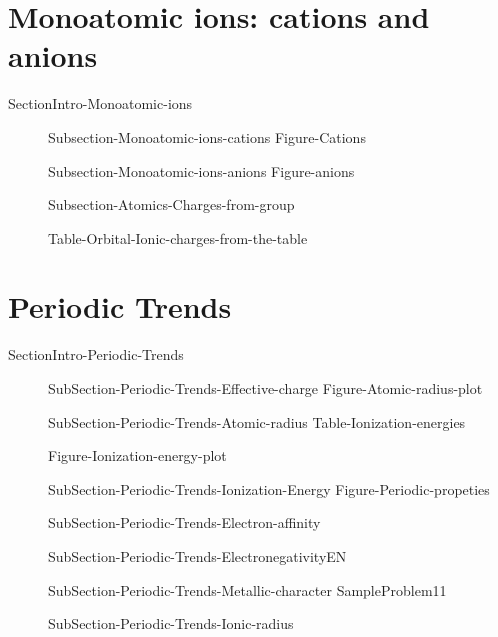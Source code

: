 \documentclass[main.tex]{subfiles}
\newcommand\chapterlabel{Ch-radiation}\setcounter{figurenewcounter}{0}\setcounter{tablenewcounter}{0}\setcounter{formulanewcounter}{0}\chapterpicture{../{\chapterlabel}/figure1}\chapterpicturelabel{PngImg}
\begin{document}
\section{Monoatomic ions: cations and anions}{SectionIntro-Monoatomic-ions}
\sloppy\begin{description}
\item[]{Subsection-Monoatomic-ions-cations}
{Figure-Cations}
\item[]{Subsection-Monoatomic-ions-anions}
{Figure-anions}
\item[]{Subsection-Atomics-Charges-from-group}

{Table-Orbital-Ionic-charges-from-the-table}

\end{description}
\newpage



\section{Periodic Trends}{SectionIntro-Periodic-Trends}
\vspace{0cm}{Figure-Atomic-radius}

\sloppy\begin{description}
\item[] {SubSection-Periodic-Trends-Effective-charge}
{Figure-Atomic-radius-plot}
\item[] {SubSection-Periodic-Trends-Atomic-radius}
{Table-Ionization-energies}

{Figure-Ionization-energy-plot}
\item[] {SubSection-Periodic-Trends-Ionization-Energy}
{Figure-Periodic-propeties}
\item[] {SubSection-Periodic-Trends-Electron-affinity}
\item[] {SubSection-Periodic-Trends-ElectronegativityEN}
\item[]{SubSection-Periodic-Trends-Metallic-character}
{SampleProblem11}
\item[]  {SubSection-Periodic-Trends-Ionic-radius}
\end{description}
\end{document}
